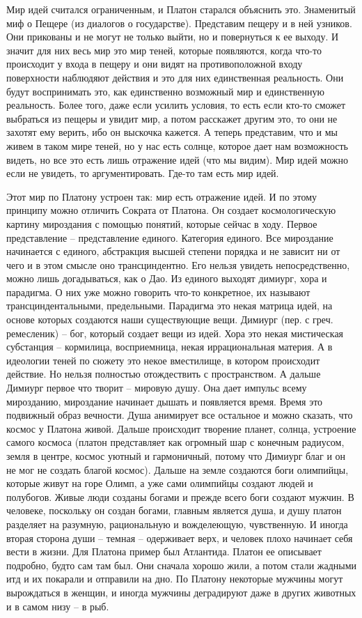 \documentclass[a4paper, 12pt]{article}
\begin{document}
Мир идей считался ограниченным, и Платон старался объяснить это. Знаменитый миф о Пещере (из диалогов о государстве). Представим пещеру и в ней узников. Они прикованы и не могут не только выйти, но и повернуться к ее выходу. И значит для них весь мир это мир теней, которые появляются, когда что-то происходит у входа в пещеру и они видят на противоположной входу поверхности наблюдяют действия и это для них единственная реальность. Они будут воспринимать это, как единственно возможный мир и единственную реальность. Более того, даже если усилить условия, то есть если кто-то сможет выбраться из пещеры и увидит мир, а потом расскажет другим это, то они не захотят ему верить, ибо он выскочка кажется. А теперь представим, что и мы живем в таком мире теней, но у нас есть солнце, которое дает нам возможность видеть, но все это есть лишь отражение идей (что мы видим). Мир идей можно если не увидеть, то аргументировать. Где-то там есть мир идей. 

Этот мир по Платону устроен так: мир есть отражение идей. И по этому принципу можно отличить Сократа от Платона. Он создает космологическую картину мироздания с помощью понятий, которые сейчас в ходу. Первое представление -- представление единого. Категория единого. Все мироздание начинается с единого, абстракция высшей степени порядка и не зависит ни от чего и в этом смысле оно трансциндентно. Его нельзя увидеть непосредственно, можно лишь догадываться, как о Дао. Из единого выходят димиург, хора и парадигма. О них уже можно говорить что-то конкретное, их называют трансциндентальными, предельными. Парадигма это некая матрица идей, на основе которых создаются наши существующие вещи. Димиург (пер. с греч. ремесленик) -- бог, который создает вещи из идей. Хора это некая мистическая субстанция -- кормилица, восприемница, некая иррациональная материя. А в идеологии теней по сюжету это некое вместилище, в котором происходит действие. Но нельзя полностью отождествить с пространством. А дальше Димиург первое что творит -- мировую душу. Она дает импульс всему мирозданию, мироздание начинает дышать и появляется время. Время это подвижный образ вечности. Душа анимирует все остальное и можно сказать, что космос у Платона живой. Дальше происходит творение планет, солнца, устроение самого космоса (платон представляет как огромный шар с конечным радиусом, земля в центре, космос уютный и гармоничный, потому что Димиург благ и он не мог не создать благой космос). Дальше на земле создаются боги олимпийцы, которые живут на горе Олимп, а уже сами олимпийцы создают людей и полубогов. Живые люди созданы богами и прежде всего боги создают мужчин. В человеке, поскольку он создан богами, главным является душа, и душу платон разделяет на разумную, рациональную и вожделеющую, чувственную. И иногда вторая сторона души -- темная -- одерживает верх, и человек плохо начинает себя вести в жизни. Для Платона пример был Атлантида. Платон ее описывает подробно, будто сам там был. Они сначала хорошо жили, а потом стали жадными итд и их покарали и отправили на дно. По Платону некоторые мужчины могут вырождаться в женщин, и иногда мужчины деградируют даже в других животных и в самом низу -- в рыб. 
\end{document}
